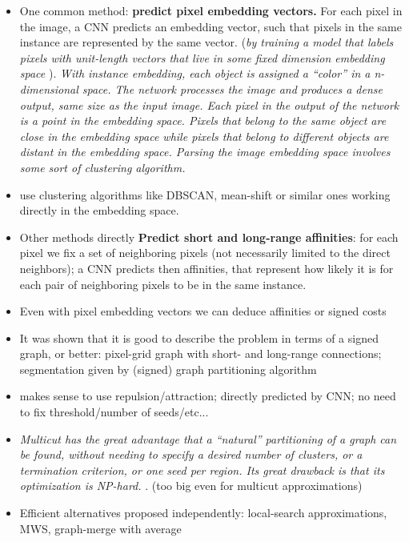 \documentclass[10pt,twocolumn,letterpaper]{article}
\newcommand\TODO[1]{{\color{red}{TODO: #1}}}
\newcommand\UPDATE[1]{{\color{blue}{#1}}}
\newcommand\SOURCE[1]{{\color{green}{(from: #1)}}}
\begin{document}
\begin{itemize}
\item One common method: \textbf{predict pixel embedding vectors.} For each pixel in the image, a CNN predicts an embedding vector, such that pixels in the same instance are represented by the same vector. (\textit{by training a model that labels pixels with unit-length vectors that live in some ﬁxed dimension embedding space} \SOURCE{Rec. embeddings} ). \textit{With instance embedding, each object is assigned a “color” in a n-dimensional space. The network processes the image and produces a dense output, same size as the input image. Each pixel in the output of the network is a point in the embedding space. Pixels that belong to the same object are close in the embedding space while pixels that belong to different objects are distant in the embedding space. Parsing the image embedding space involves some sort of clustering algorithm.} \SOURCE{online} 
\item use clustering algorithms like DBSCAN, mean-shift or similar ones working directly in the embedding space. \UPDATE{More clustering options..?}
\item Other methods directly \textbf{Predict short and long-range affinities}: for each pixel we fix a set of neighboring pixels (not necessarily limited to the direct neighbors);  a CNN predicts then affinities, that represent how likely it is for each pair of neighboring pixels to be in the same instance.
\item Even with pixel embedding vectors we can deduce affinities or signed costs
\item It was shown that it is good to describe the problem in terms of a signed graph, or better: pixel-grid graph with short- and long-range connections; segmentation given by (signed) graph partitioning algorithm  
\item makes sense to use repulsion/attraction; directly predicted by CNN; no need to fix threshold/number of seeds/etc...
\item \textit{Multicut has the great advantage that a “natural” partitioning of a graph can be found, without needing to specify a desired number of clusters, or a termination criterion, or one seed per region. Its great drawback is that its optimization is NP-hard.} \SOURCE{MWS}. (too big even for multicut approximations)
\item Efficient alternatives proposed independently: local-search approximations, MWS, graph-merge with average \TODO{Expand this part (add more items to the list) and highlight the fact that so far a clear comparison was missing and everyone was using something kind of random}

\end{itemize}
\end{document}
